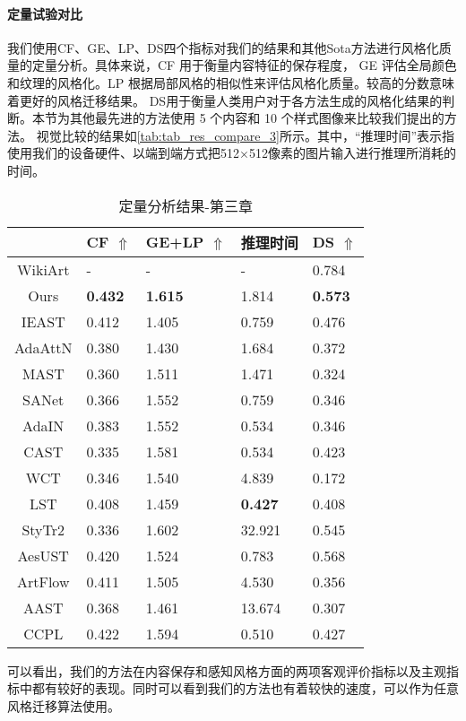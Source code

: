 \paragraph{定量试验对比}
我们使用CF、GE、LP、DS四个指标对我们的结果和其他Sota方法进行风格化质量的定量分析。具体来说，CF 用于衡量内容特征的保存程度，
GE 评估全局颜色和纹理的风格化。LP 根据局部风格的相似性来评估风格化质量。较高的分数意味着更好的风格迁移结果。
DS用于衡量人类用户对于各方法生成的风格化结果的判断。本节为其他最先进的方法使用 5 个内容和 10 个样式图像来比较我们提出的方法。
视觉比较的结果如\autoref{tab:tab_res_compare_3}所示。其中，“推理时间”表示指使用我们的设备硬件、以端到端方式把512$\times$512像素的图片输入进行推理所消耗的时间。
\begin{table}[htbp]
    \centering
    \caption{定量分析结果-第三章}
    \label{tab:tab_res_compare_3}
    \begin{tabularx}{\textwidth}{c X<{\centering} X<{\centering} X<{\centering} X<{\centering}}
        \hline
        & CF $\Uparrow$ & GE+LP $\Uparrow$ & 推理时间 & DS $\Uparrow$ \\ \hline
        WikiArt & - & - & - & 0.784 \\ 
        Ours & \textbf{0.432} & \textbf{1.615} & 1.814 & \textbf{0.573} \\
        IEAST & 0.412 & 1.405 & 0.759 & 0.476 \\ 
        AdaAttN & 0.380 & 1.430 & 1.684 & 0.372 \\ 
        MAST & 0.360 & 1.511 & 1.471 & 0.324 \\ 
        SANet & 0.366 & 1.552 & 0.759 & 0.346 \\ 
        AdaIN & 0.383 & 1.552 & 0.534 & 0.346 \\ 
        CAST & 0.335 & 1.581 & 0.534 & 0.423 \\ 
        WCT & 0.346 & 1.540 & 4.839 & 0.172 \\ 
        LST & 0.408 & 1.459 & \textbf{0.427} & 0.408 \\ 
        StyTr2 & 0.336 & 1.602 & 32.921 & 0.545 \\
        AesUST & 0.420 & 1.524 & 0.783 & 0.568 \\ 
        ArtFlow & 0.411 & 1.505 & 4.530 & 0.356 \\
        AAST & 0.368 & 1.461 & 13.674 & 0.307 \\ 
        CCPL & 0.422 & 1.594 & 0.510 & 0.427 \\ \hline
    \end{tabularx}
\end{table}
可以看出，我们的方法在内容保存和感知风格方面的两项客观评价指标以及主观指标中都有较好的表现。同时可以看到我们的方法也有着较快的速度，可以作为任意风格迁移算法使用。
